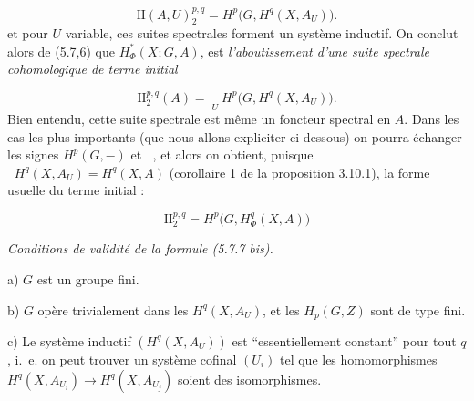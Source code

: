 \[
\mathrm {II}(A,U)_2^{p,q}=H^p\bigl(G,H^q(X,A_U)\bigr).
\]
et pour $U$ variable, ces suites spectrales forment un système inductif. On
conclut alors de (5.7,6) que $H_\Phi^*(X;G,A)$, est \textit{l'aboutissement
d'une suite spectrale cohomologique de terme initial}

\begin{equation}
\mathrm {II}_2^{p,q}(A)=\mathop{\underset{\to}{\lim.}}\limits_U H^p\bigl(G,H^q(X,A_U)\bigr).
\tag{5.7.7}
\end{equation}
Bien entendu, cette suite spectrale est même un foncteur spectral en $A$.
Dans les cas les plus importants (que nous allons expliciter ci-dessous) on
pourra échanger les signes $H^p(G,-)$ et $\mathop{\underset{\to}{\lim.}}$, et alors on obtient,
puisque $\mathop{\underset{\to}{\lim.}} H^q(X,A_U)=H^q(X,A)$ (corollaire 1 de la proposition
3.10.1), la forme usuelle du terme initial :

\begin{equation}
\mathrm {II}_2^{p,q}=H^p\bigl(G,H_\Phi^q(X,A)\bigr)
\tag{5.7.7 bis}
\end{equation}

\noindent\textit{Conditions de validité de la formule \textup{(5.7.7 bis).}}

a) $G$ est un groupe fini.

b) $G$ opère trivialement dans les $H^q(X,A_U)$, et les
$H_p(G,Z)$ sont de type fini.

c) Le système inductif $(H^q(X,A_U))$ est
``essentiellement constant'' pour tout $q$, i.~e. on peut trouver un
système cofinal $(U_i)$ tel que les homomorphismes
$H^q(X,A_{U_i})\to H^q(X,A_{U_j})$ soient des isomorphismes.

